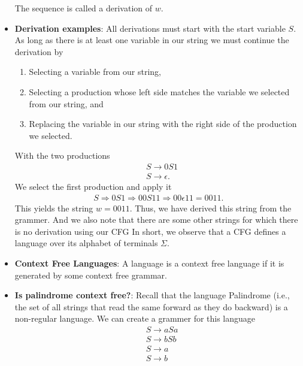 \documentclass{report}
\begin{document}
\begin{itemize}
            The sequence is called a derivation of $w$.
        \item \textbf{Derivation examples}: All derivations must start with the start variable $S$.
            \bigbreak \noindent 
            As long as there is at least one variable in our string we must continue the derivation by
            \begin{enumerate}
                \item Selecting a variable from our string,
                \item Selecting a production whose left side matches the variable we selected from our string, and
                \item Replacing the variable in our string with the right side of the production we selected.
            \end{enumerate}
            \bigbreak \noindent 
            With the two productions
            \begin{align*}
                &S \to 0S1 \\
                &S \to \epsilon
            .\end{align*}
            We select the first production and apply it 
            \begin{align*}
                S \Rightarrow 0S1 \Rightarrow 00S11 \Rightarrow 00\epsilon11 = 0011
            .\end{align*}
            This yields the string $w=0011$. Thus, we have derived this string from the grammer. And we also note that there are some other strings for which there is no derivation using our CFG
            \bigbreak \noindent 
            In short, we observe that a CFG defines a language over its alphabet of terminals $\Sigma$.
        \item \textbf{Context Free Languages}: A language is a context free language if it is generated by some context free grammar.
        \item \textbf{Is palindrome context free?}: Recall that the language Palindrome (i.e., the set of all strings that read the same forward as they do backward) is a non-regular language.
            \bigbreak \noindent 
            We can create a grammer for this language
            \begin{align*}
                &S \to aSa \\
                &S \to bSb \\
                &S \to a \\
                &S \to b \\

\end{align*}
\end{itemize}
\end{document}
